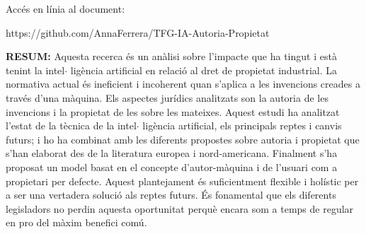 \documentclass[12pt]{article}
\renewcommand{\_}{\kern-1.5pt\textunderscore\kern-1.5pt}
\begin{document}
\par


\vspace{\baselineskip}

\vspace{\baselineskip}

\vspace{\baselineskip}

\vspace{\baselineskip}

\vspace{\baselineskip}

\vspace{\baselineskip}

\vspace{\baselineskip}

\vspace{\baselineskip}
\begin{Center}
{\fontsize{10pt}{12.0pt}\selectfont Accés en línia al document:\par}
\end{Center}\par

\begin{Center}
https://github.com/AnnaFerrera/TFG-IA-Autoria-Propietat
\end{Center}\par


\vspace{\baselineskip}
\begin{justify}
\textbf{RESUM: }Aquesta recerca és un anàlisi sobre l’impacte que ha tingut i està tenint la intel$ \cdot $ ligència artificial en relació al dret de propietat industrial. La normativa actual és ineficient i incoherent quan s’aplica a les invencions creades a través d’una màquina. Els aspectes jurídics analitzats son la autoria de les invencions i la propietat de les sobre les mateixes. Aquest estudi ha analitzat l’estat de la tècnica de la intel$ \cdot $ ligència artificial, els principals reptes i canvis futurs; i ho ha combinat amb les diferents propostes sobre autoria i propietat que s’han elaborat des de la literatura europea i nord-americana. Finalment s’ha proposat un model basat en el concepte d’autor-màquina i de l’usuari com a propietari per defecte. Aquest plantejament és suficientment flexible i holístic per a ser una vertadera solució als reptes futurs. És fonamental que els diferents legisladors no perdin aquesta oportunitat perquè encara som a temps de regular en pro del màxim benefici comú. 
\end{justify}\par
\end{document}
